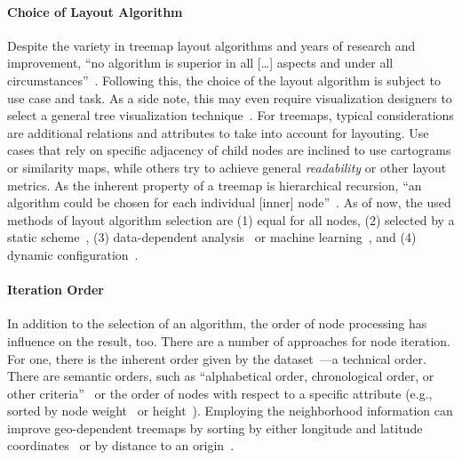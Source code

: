 \documentclass[sigconf%
,natbib=true%
]{acmart}
\begin{document}
\paragraph{\textbf{Choice of Layout Algorithm}}
Despite the variety in treemap layout algorithms and years of research and improvement, \enquote{no algorithm is superior in all [\ldots] aspects and under all circumstances}~\cite{bethge2017-mixedtreemaps}.
Following this, the choice of the layout algorithm is subject to use case and task.
As a side note, this may even require visualization designers to select a general tree visualization technique~\cite{dong2020-pansytree}.
For treemaps, typical considerations are additional relations and attributes to take into account for layouting.
Use cases that rely on specific adjacency of child nodes are inclined to use cartograms or similarity maps, while others try to achieve general \emph{readability} or other layout metrics.
As the inherent property of a treemap is hierarchical recursion, \enquote{an algorithm could be chosen for each individual [inner] node}~\cite{vliegen2006-businessdata}.
As of now, the used methods of layout algorithm selection are (1) equal for all nodes, (2) selected by a static scheme~\cite{vliegen2006-businessdata,mansmann2007-network}, (3) data-dependent analysis~\cite{hahn2017-hybrid} or machine learning~\cite{bethge2017-mixedtreemaps}, and (4) dynamic configuration~\cite{slingsby2009-configuring}.
\paragraph{\textbf{Iteration Order}}
In addition to the selection of an algorithm, the order of node processing has influence on the result, too.
There are a number of approaches for node iteration.
For one, there is the inherent order given by the dataset~\cite{johnson1991-spacefilling}---a technical order.
There are semantic orders, such as \enquote{alphabetical order, chronological order, or other criteria}~\cite{andrews1997-information} or the order of nodes with respect to a specific attribute (e.g., sorted by node weight~\cite{bruls2000-squarified} or height~\cite{limberger2017-mixed}).
Employing the neighborhood information can improve geo-dependent treemaps by sorting by either longitude and latitude coordinates~\cite{mansmann2007-network} or by distance to an origin~\cite{wood2008-spatially}.
\end{document}

